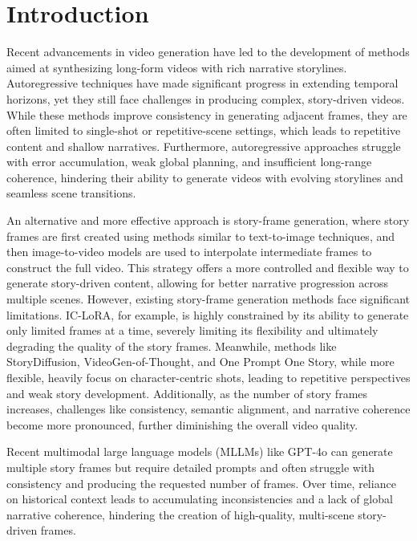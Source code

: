 \section{Introduction}

Recent advancements in video generation have led to the development of methods aimed at synthesizing long-form videos with rich narrative storylines. 
Autoregressive techniques \cite{guo2025long,henschel2024streamingt2v,qiu2023freenoise,song2025dfot,causvid} have made significant progress in extending temporal horizons, yet they still face challenges in producing complex, story-driven videos. 
While these methods improve consistency in generating adjacent frames, they are often limited to single-shot or repetitive-scene settings, which leads to repetitive content and shallow narratives. 
Furthermore, autoregressive approaches struggle with error accumulation, weak global planning, and insufficient long-range coherence, hindering their ability to generate videos with evolving storylines and seamless scene transitions.

An alternative and more effective approach is story-frame generation, where story frames are first created using methods similar to text-to-image techniques, and then image-to-video models are used to interpolate intermediate frames to construct the full video. This strategy offers a more controlled and flexible way to generate story-driven content, allowing for better narrative progression across multiple scenes. 
However, existing story-frame generation methods face significant limitations. IC-LoRA\cite{huang2024context}, for example, is highly constrained by its ability to generate only limited frames at a time, severely limiting its flexibility and ultimately degrading the quality of the story frames. Meanwhile, methods like StoryDiffusion\cite{zhou2024storydiffusion}, VideoGen-of-Thought\cite{zheng2025videogenofthoughtstepbystepgeneratingmultishot}, and One Prompt One Story\cite{liu2025one}, while more flexible, heavily focus on character-centric shots, leading to repetitive perspectives and weak story development. Additionally, as the number of story frames increases, challenges like consistency, semantic alignment, and narrative coherence become more pronounced, further diminishing the overall video quality.

Recent multimodal large language models (MLLMs) like GPT-4o\cite{gpt4o} can generate multiple story frames but require detailed prompts and often struggle with consistency and producing the requested number of frames. Over time, reliance on historical context leads to accumulating inconsistencies and a lack of global narrative coherence, hindering the creation of high-quality, multi-scene story-driven frames.


